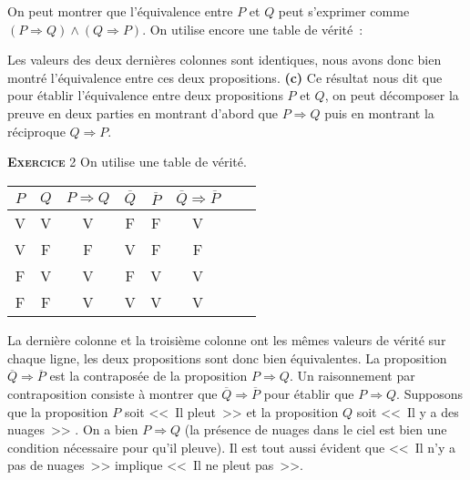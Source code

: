 \documentclass[10pt,a4paper,notitlepage]{article}
\newcommand{\exercice}[1]{\textsc{\textbf{Exercice}} #1}
\begin{document}
On peut montrer que l'équivalence entre $P$ et $Q$ peut s'exprimer
comme $ (P\Rightarrow Q) \land (Q\Rightarrow P)$. On utilise encore
une table de vérité :
\begin{table}[H]
  \centering
{}
\end{table}
Les valeurs des deux dernières colonnes sont identiques, nous avons
donc bien montré l'équivalence entre ces deux
propositions. \textbf{(c)} Ce résultat nous dit que pour établir
l'équivalence entre deux propositions $P$ et $Q$, on peut décomposer
la preuve en deux parties en montrant d'abord que $P\Rightarrow Q$
puis en montrant la réciproque $Q\Rightarrow P$.

\bigskip

\exercice{2} On utilise une table de vérité.

\begin{table}[H]
  \centering
 \begin{tabular}{cc|cccccc}
    $P$ & $Q$ & $P\Rightarrow Q$ & $\overline{Q}$ & $\overline{P}$ & $\overline{Q}\Rightarrow\overline{P}$   \\ 
    \hline
    V & V & V & F & F & V\\
    V & F & F & V & F & F\\
    F & V & V & F & V & V\\
    F & F & V & V & V & V\\
  \end{tabular}
\end{table}

La dernière colonne et la troisième colonne ont les mêmes valeurs de
vérité sur chaque ligne, les deux propositions sont donc bien
équivalentes. La proposition $\overline{Q}\Rightarrow\overline{P}$ est
la contraposée de la proposition $P\Rightarrow Q$. Un raisonnement par
contraposition consiste à montrer que
$\overline{Q}\Rightarrow\overline{P}$ pour établir que
$P\Rightarrow Q$. Supposons que la proposition $P$ soit <<~Il pleut~>>
et la proposition $Q$ soit <<~Il y a des nuages~>> . On a bien
$P\Rightarrow Q$ (la présence de nuages dans le ciel est bien une
condition nécessaire pour qu'il pleuve). Il est tout aussi évident que
<<~Il n'y a pas de nuages~>> implique <<~Il ne pleut pas~>>.
\end{document}
